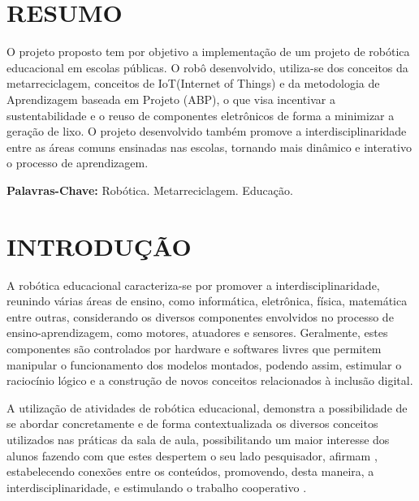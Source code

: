 \documentclass[a0,portrait,brazil]{a0poster}
\begin{document}
\begin{multicols}{3} 

\color{black} 
\begin{large}
\section*{RESUMO}
O projeto proposto tem por objetivo a implementação de um projeto de robótica educacional em escolas públicas. O robô desenvolvido, utiliza-se dos conceitos da metarreciclagem, conceitos de IoT(Internet of Things) e da metodologia de Aprendizagem baseada em Projeto (ABP), o que visa incentivar a sustentabilidade e o reuso de componentes eletrônicos de forma a minimizar a geração de lixo. O projeto desenvolvido também promove a interdisciplinaridade entre as áreas comuns ensinadas nas escolas, tornando mais dinâmico e interativo o processo de aprendizagem.
\vspace{0.1cm}

\textbf{Palavras-Chave:} Robótica. Metarreciclagem. Educação.

\color{black}
\section*{INTRODUÇÃO}
A robótica educacional caracteriza-se por promover a interdisciplinaridade, reunindo várias áreas de ensino, como informática, eletrônica, física, matemática entre outras, considerando os diversos componentes envolvidos no processo de ensino-aprendizagem, como motores, atuadores e sensores. Geralmente, estes componentes são controlados por hardware e softwares livres que permitem manipular o funcionamento dos modelos montados, podendo assim, estimular o raciocínio lógico e a construção de novos conceitos relacionados à inclusão digital.
\medskip

A utilização de atividades de robótica educacional, demonstra a possibilidade de se abordar concretamente e de forma contextualizada os diversos conceitos utilizados nas práticas da sala de aula, possibilitando um maior interesse dos alunos fazendo com que estes despertem o seu lado pesquisador, afirmam \cite{robo3}, estabelecendo conexões entre os conteúdos, promovendo, desta maneira, a interdisciplinaridade, e estimulando o trabalho cooperativo \cite{robo1}.
\medskip


\end{large}
\end{multicols}
\end{document}
